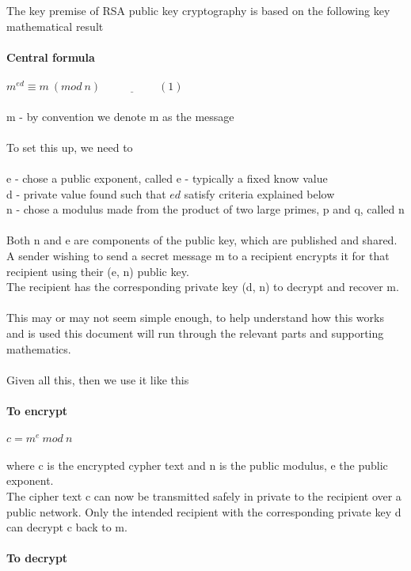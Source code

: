 \documentclass[11pt]{article}   	%
\begin{document}
The key premise of RSA public key cryptography is based on the following key mathematical result \\
\\
\textbf{Central formula} \\
\\
$ m^{ed} \equiv m \ (mod \ n)  \ \ \underline{\hspace{2cm}}(1) $\\
\\
m - by convention we denote m as the message \\
\\
To set this up, we need to \\
\\
e - chose a public exponent, called e - typically a fixed know value \\
d - private value found such that $ ed $ satisfy criteria explained below \\
n - chose a modulus made from the product of two large primes, p and q, called n \\
\\
Both n and e are components of the public key, which are published and shared. \\
A sender wishing to send a secret message m to a recipient encrypts it for that recipient using their (e, n) public key. \\
The recipient has the corresponding private key (d, n) to decrypt and recover m. \\
\\
This may or may not seem simple enough, to help understand how this works and is used this document will run through the relevant parts and supporting mathematics. \\
\\
Given all this, then we use it like this \\
\\
\textbf{To encrypt} \\
\\
$ c = m^e \ mod \ n $ \\
\\
where c is the encrypted cypher text and n is the public modulus, e the public exponent.
\\
The cipher text c can now be transmitted safely in private to the recipient over a public network. Only the intended recipient with the corresponding private key d can decrypt c back to m. \\
\\
\textbf{To decrypt} \\
\end{document}
